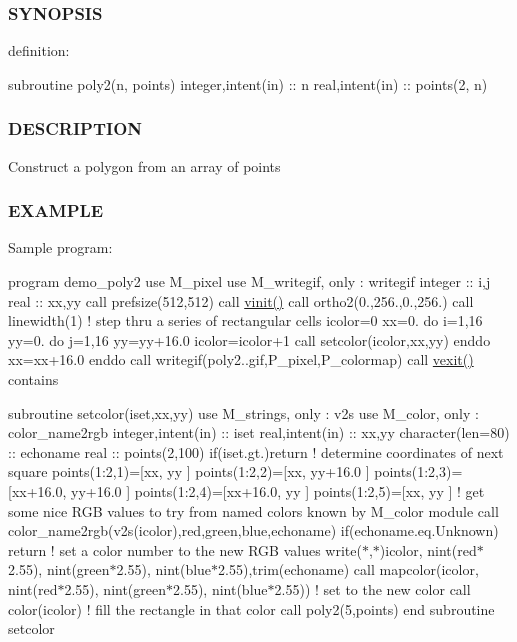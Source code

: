 \subsubsection*{S\+Y\+N\+O\+P\+S\+IS}

definition\+:

subroutine poly2(n, points) integer,intent(in) \+:\+: n real,intent(in) \+:\+: points(2, n)

\subsubsection*{D\+E\+S\+C\+R\+I\+P\+T\+I\+ON}

Construct a polygon from an array of points \subsubsection*{E\+X\+A\+M\+P\+LE}

Sample program\+:

program demo\+\_\+poly2 use M\+\_\+pixel use M\+\_\+writegif, only \+: writegif integer \+:\+: i,j real \+:\+: xx,yy call prefsize(512,512) call \hyperlink{namespacem__pixel_ac03ca8f23fdadb60599b6ea4dc87a6d9}{vinit()} call ortho2(0.,256.,0.,256.) call linewidth(1) ! step thru a series of rectangular cells icolor=0 xx=0. do i=1,16 yy=0. do j=1,16 yy=yy+16.0 icolor=icolor+1 call setcolor(icolor,xx,yy) enddo xx=xx+16.0 enddo call writegif(\textquotesingle{}poly2..\+gif\textquotesingle{},P\+\_\+pixel,P\+\_\+colormap) call \hyperlink{namespacem__pixel_a19ad6b65752322b0029a62cc0ebec3e8}{vexit()} contains

subroutine setcolor(iset,xx,yy) use M\+\_\+strings, only \+: v2s use M\+\_\+color, only \+: color\+\_\+name2rgb integer,intent(in) \+:\+: iset real,intent(in) \+:\+: xx,yy character(len=80) \+:\+: echoname real \+:\+: points(2,100) if(iset.\+gt.)return ! determine coordinates of next square points(1\+:2,1)=\mbox{[}xx, yy \mbox{]} points(1\+:2,2)=\mbox{[}xx, yy+16.0 \mbox{]} points(1\+:2,3)=\mbox{[}xx+16.0, yy+16.0 \mbox{]} points(1\+:2,4)=\mbox{[}xx+16.0, yy \mbox{]} points(1\+:2,5)=\mbox{[}xx, yy \mbox{]} ! get some nice R\+GB values to try from named colors known by M\+\_\+color module call color\+\_\+name2rgb(v2s(icolor),red,green,blue,echoname) if(echoname.\+eq.\textquotesingle{}Unknown\textquotesingle{}) return ! set a color number to the new R\+GB values write($\ast$,$\ast$)icolor, nint(red$\ast$2.55), nint(green$\ast$2.55), nint(blue$\ast$2.55),trim(echoname) call mapcolor(icolor, nint(red$\ast$2.55), nint(green$\ast$2.55), nint(blue$\ast$2.55)) ! set to the new color call color(icolor) ! fill the rectangle in that color call poly2(5,points) end subroutine setcolor

